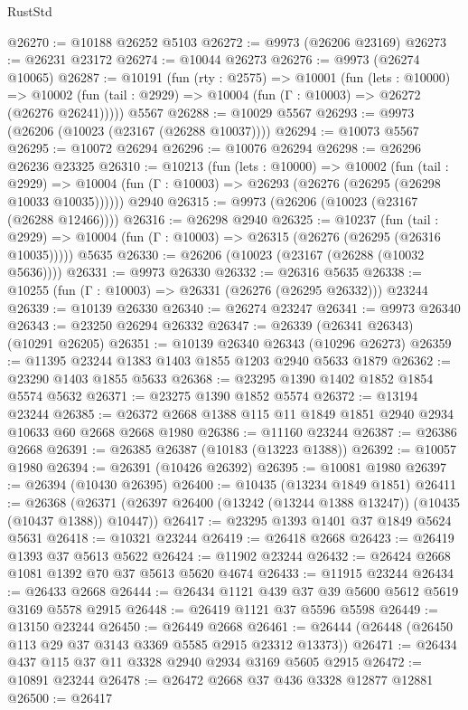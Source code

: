 \begin{lexlean}{RustStd}
\begin{coremodule}
@26270 := @10188 @26252 @5103
@26272 := @9973 (@26206 @23169)
@26273 := @26231 @23172
@26274 := @10044 @26273
@26276 := @9973 (@26274 @10065)
@26287 := @10191
    (fun (rty : @2575) =>
    @10001
      (fun (lets : @10000) =>
      @10002 (fun (tail : @2929) => @10004 (fun (Γ : @10003) => @26272 (@26276 @26241)))))
    @5567
@26288 := @10029 @5567
@26293 := @9973 (@26206 (@10023 (@23167 (@26288 @10037))))
@26294 := @10073 @5567
@26295 := @10072 @26294
@26296 := @10076 @26294
@26298 := @26296 @26236 @23325
@26310 := @10213
    (fun (lets : @10000) =>
    @10002
      (fun (tail : @2929) =>
      @10004 (fun (Γ : @10003) => @26293 (@26276 (@26295 (@26298 @10033 @10035))))))
    @2940
@26315 := @9973 (@26206 (@10023 (@23167 (@26288 @12466))))
@26316 := @26298 @2940
@26325 := @10237
    (fun (tail : @2929) => @10004 (fun (Γ : @10003) => @26315 (@26276 (@26295 (@26316 @10035)))))
    @5635
@26330 := @26206 (@10023 (@23167 (@26288 (@10032 @5636))))
@26331 := @9973 @26330
@26332 := @26316 @5635
@26338 := @10255 (fun (Γ : @10003) => @26331 (@26276 (@26295 @26332))) @23244
@26339 := @10139 @26330
@26340 := @26274 @23247
@26341 := @9973 @26340
@26343 := @23250 @26294 @26332
@26347 := @26339 (@26341 @26343) (@10291 @26205)
@26351 := @10139 @26340 @26343 (@10296 @26273)
@26359 := @11395 @23244 @1383 @1403 @1855 @1203 @2940 @5633 @1879
@26362 := @23290 @1403 @1855 @5633
@26368 := @23295 @1390 @1402 @1852 @1854 @5574 @5632
@26371 := @23275 @1390 @1852 @5574
@26372 := @13194 @23244
@26385 := @26372 @2668 @1388 @115 @11 @1849 @1851 @2940 @2934 @10633 @60 @2668 @2668 @1980
@26386 := @11160 @23244
@26387 := @26386 @2668
@26391 := @26385 @26387 (@10183 (@13223 @1388))
@26392 := @10057 @1980
@26394 := @26391 (@10426 @26392)
@26395 := @10081 @1980
@26397 := @26394 (@10430 @26395)
@26400 := @10435 (@13234 @1849 @1851)
@26411 := @26368
    (@26371 (@26397 @26400 (@13242 (@13244 @1388 @13247)) (@10435 (@10437 @1388)) @10447))
@26417 := @23295 @1393 @1401 @37 @1849 @5624 @5631
@26418 := @10321 @23244
@26419 := @26418 @2668
@26423 := @26419 @1393 @37 @5613 @5622
@26424 := @11902 @23244
@26432 := @26424 @2668 @1081 @1392 @70 @37 @5613 @5620 @4674
@26433 := @11915 @23244
@26434 := @26433 @2668
@26444 := @26434 @1121 @439 @37 @39 @5600 @5612 @5619 @3169 @5578 @2915
@26448 := @26419 @1121 @37 @5596 @5598
@26449 := @13150 @23244
@26450 := @26449 @2668
@26461 := @26444 (@26448 (@26450 @113 @29 @37 @3143 @3369 @5585 @2915 @23312 @13373))
@26471 := @26434 @437 @115 @37 @11 @3328 @2940 @2934 @3169 @5605 @2915
@26472 := @10891 @23244
@26478 := @26472 @2668 @37 @436 @3328 @12877 @12881
@26500 := @26417

\end{coremodule}
\end{lexlean}
